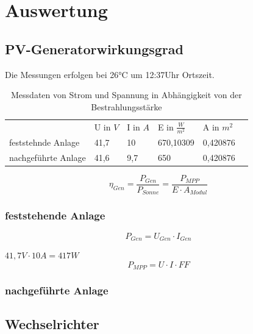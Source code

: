 \section{Auswertung}
\subsection{PV-Generatorwirkungsgrad}
Die Messungen erfolgen bei 26°C um 12:37Uhr Ortszeit.
 
 \begin{table}[!ht]
 \caption{Messdaten von Strom und Spannung in Abhängigkeit von der Bestrahlungsstärke}
\begin{tabular}{llllll}
\rowcolor[HTML]{76B900} 
                                            & U in $V$ & I in $A$ & E in $\frac{W}{m^2}$ & A in $m^2$ \\
\cellcolor[HTML]{76B900}feststehnde Anlage  & 41,7   & 10     & 670,10309                   & 0,420876                  \\
\cellcolor[HTML]{76B900}nachgeführte Anlage & 41,6   & 9,7    & 650                         & 0,420876                 
\end{tabular}
\label{tab:230514_Messtabelle}
\end{table}

\begin{equation}
\eta_{Gen}=\frac{P_{Gen}}{P_{Sonne}}=\frac{P_{MPP}}{E\cdot A_{Modul}}
\label{eq:230514_Wirkungsgrad_Generator}
\end{equation}

\subsubsection{feststehende Anlage}
\begin{equation}
P_{Gen} = U_{Gen} \cdot I_{Gen}
\label{eq:230514_Leistung}
\end{equation}

$ 41,7V \cdot 10A = 417W $ 
\begin{equation}
P_{MPP} = U \cdot I \cdot FF
\label{eq:230509_Leistung_im_MPP}
\end{equation}

\subsubsection{nachgeführte Anlage}
\subsection{Wechselrichter}
